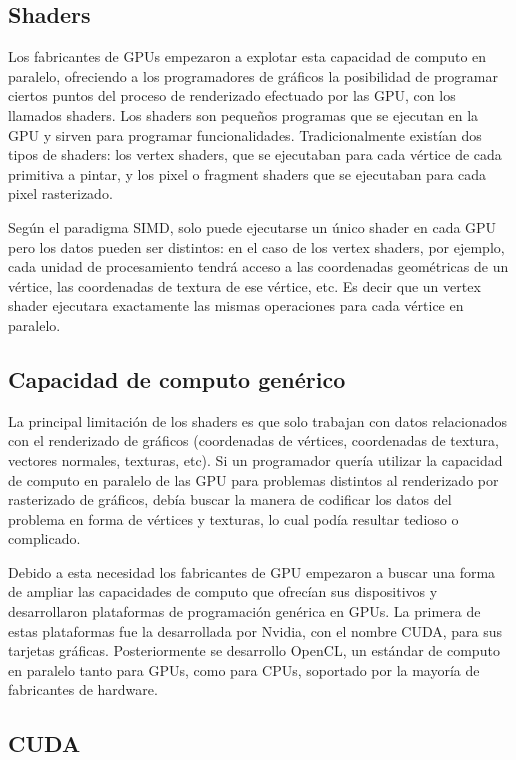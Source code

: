 \subsection{Shaders}

Los fabricantes de GPUs empezaron a explotar esta capacidad de computo en paralelo, ofreciendo a los programadores de gráficos la posibilidad de programar ciertos puntos del proceso de renderizado efectuado por las GPU, con los llamados shaders. Los shaders son pequeños programas que se ejecutan en la GPU y sirven para programar funcionalidades. Tradicionalmente existían dos tipos de shaders: los vertex shaders, que se ejecutaban para cada vértice de cada primitiva a pintar, y los pixel o fragment shaders que se ejecutaban para cada pixel rasterizado.

\medskip
Según el paradigma SIMD, solo puede ejecutarse un único shader en cada GPU pero los datos pueden ser distintos: en el caso de los vertex shaders, por ejemplo, cada unidad de procesamiento tendrá acceso a las coordenadas geométricas de un vértice, las coordenadas de textura de ese vértice, etc. Es decir que un vertex shader ejecutara exactamente las mismas operaciones para cada vértice en paralelo. 

\clearpage

\subsection{Capacidad de computo genérico}
La principal limitación de los shaders es que solo trabajan con datos relacionados con el renderizado de gráficos (coordenadas de vértices, coordenadas de textura, vectores normales, texturas, etc). Si un programador quería utilizar la capacidad de computo en paralelo de las GPU para problemas distintos al renderizado por rasterizado de gráficos, debía buscar la manera de codificar los datos del problema en forma de vértices y texturas, lo cual podía resultar tedioso o complicado.

\medskip
Debido a esta necesidad los fabricantes de GPU empezaron a buscar una forma de ampliar las capacidades de computo que ofrecían sus dispositivos y desarrollaron plataformas de programación genérica en GPUs. La primera de estas plataformas fue la desarrollada por Nvidia, con el nombre CUDA, para sus tarjetas gráficas. Posteriormente se desarrollo OpenCL, un estándar de computo en paralelo tanto para GPUs, como para CPUs, soportado por la mayoría de fabricantes de hardware.

\subsection{CUDA}


